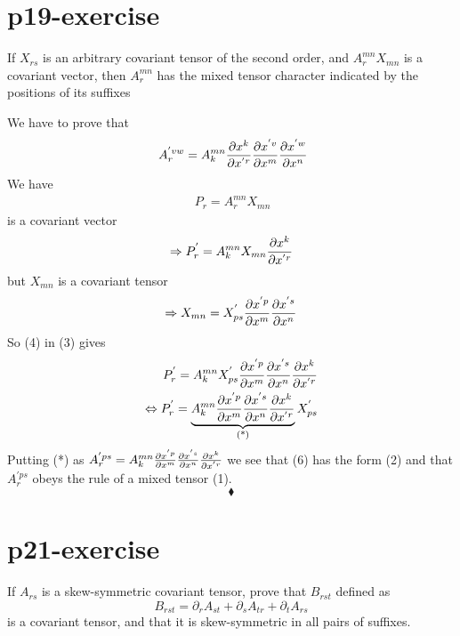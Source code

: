 \section{p19-exercise}
\begin{tcolorbox}
If $X_{rs}$ is an arbitrary covariant tensor of the second order, and $A^{mn}_{r }X_{mn}$ is a covariant vector, then $A^{mn}_{r }$ has the mixed tensor character indicated by the positions of its suffixes 
\end{tcolorbox}
We have to prove that
\begin{align}
\ A^{'vw}_{r} = A^{mn}_k\pdv{x^{k}}{x^{'r}}\pdv{x^{'v}}{x^{m}}\pdv{x^{'w}}{x^{n}} 
\end{align}
We have
\begin{align}
\ P_{r} =A^{mn}_{r }X_{mn}
\end{align}
is a covariant vector
\begin{align}
\Rightarrow P^{'}_{r} =A^{mn}_{k }X_{mn}\pdv{x^{k}}{x^{'r}}
\end{align}
but $X_{mn}$ is a covariant tensor
\begin{align}
\Rightarrow X_{mn} = X^{'}_{ps}\pdv{x^{'p}}{x^{m}}\pdv{x^{'s}}{x^{n}}
\end{align}
So (4) in (3) gives
\begin{align}
\ P^{'}_{r} =A^{mn}_{k }X^{'}_{ps}\pdv{x^{'p}}{x^{m}}\pdv{x^{'s}}{x^{n}}\pdv{x^{k}}{x^{'r}}\\
\Leftrightarrow P^{'}_{r} = \underbrace{A^{mn}_{k }\pdv{x^{'p}}{x^{m}}\pdv{x^{'s}}{x^{n}}\pdv{x^{k}}{x^{'r}}}_\text{(*)}X^{'}_{ps}
\end{align}
Putting (*) as $ A^{'ps}_{r }= A^{mn}_{k }\pdv{x^{'p}}{x^{m}}\pdv{x^{'s}}{x^{n}}\pdv{x^{k}}{x^{'r}}$ we see that (6) has the form (2) and that $A^{'ps}_{r }$ obeys the rule of a mixed tensor (1).
$$\blacklozenge$$
\pagebreak[4]

\section{p21-exercise}
\begin{tcolorbox}
If $A_{rs}$ is a skew-symmetric covariant tensor, prove that $B_{rst}$ defined as 
$$B_{rst} = \partial_{r}{A_{st}} + \partial_{s}{A_{tr}} +\partial_{t}{A_{rs}} $$ is a covariant tensor, and that it is skew-symmetric in all pairs of suffixes.
\end{tcolorbox}


